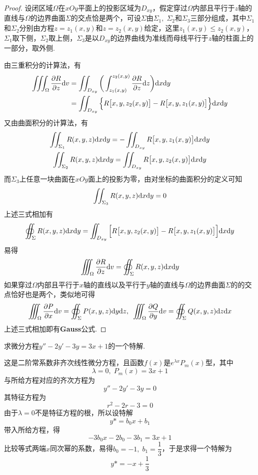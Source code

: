 \documentclass[12pt, a4paper, oneside, UTF8]{ctexbook}  %
\begin{document}
\begin{proof}
    设闭区域$\Omega$在$xOy$平面上的投影区域为$D_{xy}$，假定穿过$\Omega$内部且平行于$z$轴的直线与$\Omega$的边界曲面$\Sigma$的交点恰是两个，可设$\Sigma$由$\Sigma_1,\;\Sigma_2$和$\Sigma_3$三部分组成，其中$\Sigma_1$和$\Sigma_2$分别由方程$z = z_1(x,y)$和$z = z_2(x,y)$给定，这里$z_1(x,y) \le z_2(x,y)$，$\Sigma_1$取下侧，$\Sigma_2$取上侧，$\Sigma_3$是以$D_{xy}$的边界曲线为准线而母线平行于$z$轴的柱面上的一部分，取外侧.

    由三重积分的计算法，有
    \begin{align*}
        \iiint_{\Omega}\frac{\partial R}{\partial z}\textup{d} v & = \iint_{D_{xy}}\bigg(\int_{z_1(x,y)}^{z_2(x,y)} \frac{\partial R}{\partial z}\textup{d} z\bigg) \textup{d} x\textup{d} y \\
                                                         & =\iint_{D_{xy}}\Big\{R\big[x,y,z_2(x,y)\big]-R\big[x,y,z_1(x,y)\big]\Big\}\textup{d} x\textup{d} y
    \end{align*}
    又由曲面积分的计算法，有
    \begin{gather*}
        \iint_{\Sigma_1}R(x,y,z)\textup{d} x\textup{d} y = -\iint_{D_{xy}}R\big[x,y,z_1(x,y) \big]\textup{d} x\textup{d} y \\
        \iint_{\Sigma_2}R(x,y,z)\textup{d} x\textup{d} y = \iint_{D_{xy}}R\big[x,y,z_2(x,y) \big]\textup{d} x\textup{d} y
    \end{gather*}
    而$\Sigma_3$上任意一块曲面在$xOy$面上的投影为零，由对坐标的曲面积分的定义可知
    \[
        \iint_{\Sigma_3}R(x,y,z)\textup{d} x\textup{d} y = 0
    \]
    上述三式相加有
    \[
        \oiint_{\Sigma}R(x,y,z)\textup{d} x\textup{d} y = \iint_{D_{xy}}\Big[R\big[x,y,z_2(x,y)\big]-R\big[x,y,z_1(x,y)\big]\Big]\textup{d} x\textup{d} y
    \]
    易得
    \[
        \iiint_{\Omega}\frac{\partial R}{\partial z}\textup{d} v = \oiint_{\Sigma}R(x,y,z)\textup{d} x\textup{d} y
    \]
    如果穿过$\Omega$内部且平行于$x$轴的直线以及平行于$y$轴的直线与$\Omega$的边界曲面$\Sigma$的的交点恰好也是两个，类似地可得
    \[
        \iiint_{\Omega}\frac{\partial P}{\partial x}\textup{d} v = \oiint_{\Sigma}P(x,y,z)\textup{d} y\textup{d} z,\enspace \iiint_{\Omega}\frac{\partial Q}{\partial y}\textup{d} v = \oiint_{\Sigma}Q(x,y,z)\textup{d} z\textup{d} x
    \]
    上述三式相加即有\textbf{Gauss}公式.
\end{proof}

\begin{example}
    求微分方程$y''-2y'-3y=3x+1$的一个特解.
\end{example}
\begin{solution}
    这是二阶常系数非齐次线性微分方程，且函数$f(x)$是$e^{\lambda{x}}P_m(x)$型，其中
    \[
        \lambda = 0,\;P_m(x) = 3x+1
    \]
    与所给方程对应的齐次方程为
    \[
        y''-2y'-3y=0
    \]
    其特征方程为
    \[
        r^2-2r-3 = 0
    \]
    由于$\lambda = 0$不是特征方程的根，所以设特解
    \[
        y* = b_0 x + b_1
    \]
    带入所给方程，得
    \[
        -3b_0 x - 2b_0 - 3b_1 = 3x+1
    \]
    比较等式两端$x$同次幂的系数，易得$b_0 = -1,\;b_1 = \dfrac{1}{3}$，于是求得一个特解为
    \[
        y* = -x + \frac{1}{3}
    \]
\end{solution}
\end{document}
